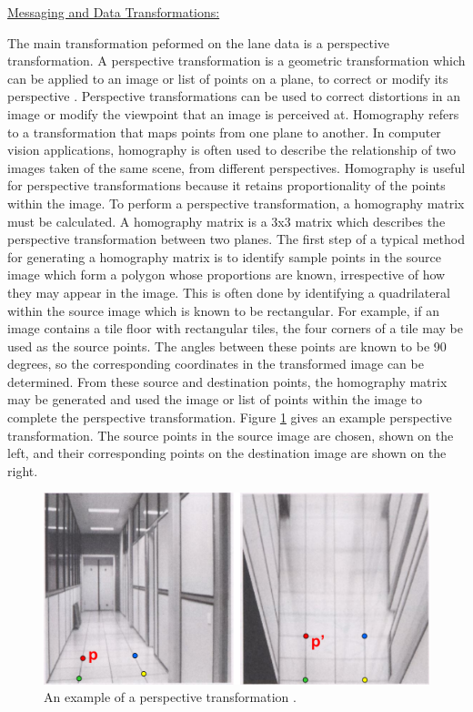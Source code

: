 \documentclass[titlepage,draft]{article}
\begin{document}
\underline{Messaging and Data Transformations:}

The main transformation peformed on the lane data is a perspective transformation. A perspective transformation is a geometric transformation which can be applied to an image or list of points on a plane, to correct or modify its perspective \cite{CarletonHomography}. Perspective transformations can be used to correct distortions in an image or modify the viewpoint that an image is perceived at.
Homography refers to a transformation that maps points from one plane to another. In computer vision applications, homography is often used to describe the relationship of two images taken of the same scene, from different perspectives. Homography is useful for perspective transformations because it retains proportionality of the points within the image. To perform a perspective transformation, a homography matrix must be calculated. A homography matrix is a 3x3 matrix which describes the perspective transformation between two planes.
The first step of a typical method for generating a homography matrix is to identify sample points in the source image which form a polygon whose proportions are known, irrespective of how they may appear in the image. This is often done by identifying a quadrilateral within the source image which is known to be rectangular. For example, if an image contains a tile floor with rectangular tiles, the four corners of a tile may be used as the source points. The angles between these points are known to be 90 degrees, so the corresponding coordinates in the transformed image can be determined. From these source and destination points, the homography matrix may be generated and used the image or list of points within the image to complete the perspective transformation. Figure \ref{CarletonTransform} gives an example perspective transformation. The source points in the source image are chosen, shown on the left, and their corresponding points on the destination image are shown on the right.
\begin{figure}
	\centering
	\includegraphics[width=6in]{transform_carleton.png}
	\caption{An example of a perspective transformation \cite{CarletonHomography}.}
	\label{CarletonTransform}
\end{figure}
\end{document}
